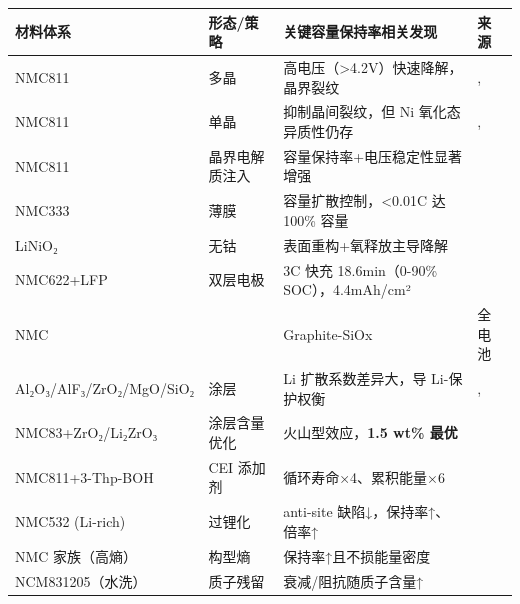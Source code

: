 \documentclass[12pt,a4paper]{ctexart}
\begin{document}
{\def\LTcaptype{none} %
\begin{longtable}[]{@{}
  >{\raggedright\arraybackslash}p{}
  >{\raggedright\arraybackslash}p{}
  >{\raggedright\arraybackslash}p{}
  >{\raggedright\arraybackslash}p{}@{}}
\toprule\noalign{}
\begin{minipage}[b]{\linewidth}\raggedright
材料体系
\end{minipage} & \begin{minipage}[b]{\linewidth}\raggedright
形态/策略
\end{minipage} & \begin{minipage}[b]{\linewidth}\raggedright
关键容量保持率相关发现
\end{minipage} & \begin{minipage}[b]{\linewidth}\raggedright
来源
\end{minipage} \\
\midrule\noalign{}
\endhead
\bottomrule\noalign{}
\endlastfoot
NMC811 & 多晶 & 高电压（\textgreater4.2V）快速降解，晶界裂纹 & \cite{p24}, \cite{p25} \\
NMC811 & 单晶 & 抑制晶间裂纹，但 Ni 氧化态异质性仍存 & \cite{p24}, \cite{p25} \\
NMC811 & 晶界电解质注入 & 容量保持率+电压稳定性显著增强 & \cite{p06} \\
NMC333 & 薄膜 & 容量扩散控制，\textless0.01C 达 100\% 容量 & \cite{p35} \\
LiNiO₂ & 无钴 & 表面重构+氧释放主导降解 & \cite{p32} \\
NMC622+LFP & 双层电极 & 3C 快充 18.6min（0-90\% SOC），4.4mAh/cm² & \cite{p29} \\
NMC & & Graphite-SiOx & 21700 全电池 \\
Al₂O₃/AlF₃/ZrO₂/MgO/SiO₂ & 涂层 & Li 扩散系数差异大，导 Li-保护权衡 & \cite{p42}, \cite{p39} \\
NMC83+ZrO₂/Li₂ZrO₃ & 涂层含量优化 & 火山型效应，\textbf{1.5 wt\% 最优} & \cite{p46} \\
NMC811+3-Thp-BOH & CEI 添加剂 & 循环寿命×4、累积能量×6 & \cite{p43} \\
NMC532 (Li-rich) & 过锂化 & anti-site 缺陷↓，保持率↑、倍率↑ & \cite{p44} \\
NMC 家族（高熵） & 构型熵 & 保持率↑且不损能量密度 & \cite{p45} \\
NCM831205（水洗） & 质子残留 & 衰减/阻抗随质子含量↑ & \cite{p48} \\
\end{longtable}
}
\end{document}
